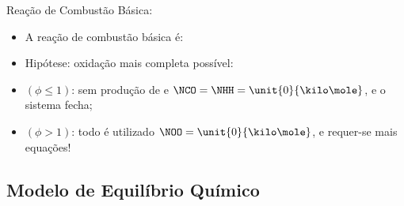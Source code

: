     \begin{frame}{Reação de Combustão Básica:}\vspace*{-2em}
        \begin{itemize}
            \item<1-> A \alert{reação de combustão básica} é:
        \end{itemize}
        \vspace*{\bigskipamount}
        \par\vspace*{\bigskipamount}\hfill
        \vspace*{\bigskipamount}
        \begin{itemize}
            \item<10-> Hipótese: oxidação \alert{mais completa} possível:
            \item<11-> \alert{$(\phi \leqslant 1)$}: sem produção de \alert{} e
                \alert{} \ce{->} \alert{$\NCO = \NHH = \unit{0}{\kilo\mole}$}, e o
                sistema fecha;
            \item<12-> \alert{$(\phi > 1)$}: todo \alert{} é utilizado \ce{->}
                \alert{$\NOO = \unit{0}{\kilo\mole}$}, e requer-se mais equações!
        \end{itemize}
    \end{frame}

\subsection{Modelo de Equilíbrio Químico}

